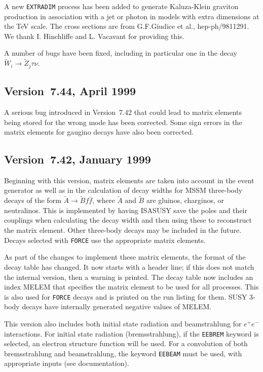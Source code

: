         A new \verb|EXTRADIM| process has been added to generate
Kaluza-Klein graviton production in association with a jet or photon in
models with extra dimensions at the TeV scale. The cross sections are
from G.F.Giudice et al., hep-ph/9811291. We thank I. Hinchliffe and L.
Vacavant for providing this.

        A number of bugs have been fixed, including in particular one in
the decay $\widetilde W_i \to \widetilde Z_j \tau \nu$.

\subsection{Version~7.44, April 1999}

        A serious bug introduced in Version~7.42 that could lead to
matrix elements being stored for the wrong mode has been corrected.
Some sign errors in the matrix elements for gaugino decays have also
been corrected.

\subsection{Version~7.42, January 1999}

        Beginning with this version, matrix elements are taken into
account in the event generator as well as in the calculation of decay
widths for MSSM three-body decays of the form $\tilde A \to \tilde B f
\bar f$, where $\tilde A$ and $\tilde B$ are gluinos, charginos, or
neutralinos. This is implemented by having ISASUSY save the poles and
their couplings when calculating the decay width and then using these
to reconstruct the matrix element. Other three-body decays may be
included in the future. Decays selected with \verb|FORCE| use the
appropriate matrix elements.

        As part of the changes to implement these matrix elements, the
format of the decay table has changed. It now starts with a header
line; if this does not match the internal version, then a warning is
printed. The decay table now includes an index MELEM that specifies the
matrix element to be used for all processes. This is also used for
\verb|FORCE| decays and is printed on the run listing for them. SUSY
3-body decays have internally generated negative values of MELEM.

        This version also includes both initial state radiation and
beamstrahlung for $e^+e^-$ interactions. For initial state radiation
(bremsstrahlung), if the \verb|EEBREM| keyword is selected, an electron
structure function will be used. For a convolution of both
bremsstrahlung and beamstrahlung, the keyword \verb|EEBEAM| must be
used, with appropriate inputs (see documentation).

